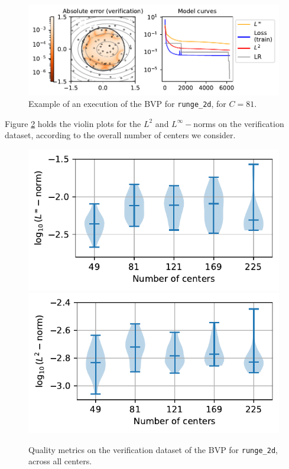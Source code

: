 \documentclass[12pt]{report} %
\begin{document}
\begin{figure}
  \includegraphics[width=\textwidth]{imagenes/experiments/2d/pde_runge_2d/runge_2d-TR15-C81-rrrrepetishon-E6270.pdf}
  \caption{Example of an execution of the BVP for \texttt{runge\_2d}, for $C=81$.}
  \label{fig:example-execution-runge-2d-pde}
\end{figure}

Figure \ref{fig:violins-runge-pde-2d} holds the violin plots for the $L^2$ and $L^\infty-$norms on the verification dataset, according to the overall number of centers we consider. %

\begin{figure}
  \includegraphics[width=.45\textwidth]{imagenes/experiments/2d/pde_runge_2d/violins_linf_runge_2d_endgame.pdf}
  \includegraphics[width=.45\textwidth]{imagenes/experiments/2d/pde_runge_2d/violins_l2_runge_2d_endgame.pdf}
  \caption{Quality metrics on the verification dataset of the BVP for \texttt{runge\_2d}, across all centers.}
  \label{fig:violins-runge-pde-2d}
\end{figure}
\end{document}
